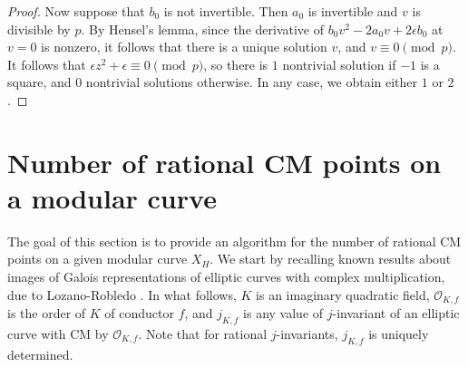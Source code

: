 \documentclass[10pt,leqno]{amsart}
\theoremstyle{definition}
\theoremstyle{remark}
\numberwithin{theorem}{section}
\begin{document}
\begin{proof}
Now suppose that $b_0$ is not invertible. Then $a_0$ is invertible and $v$ is divisible by $p$. By Hensel's lemma, since the derivative of $b_0v^2-2a_0v+2\epsilon b_0$ at $v=0$ is nonzero, it follows that there is a unique solution $v$, and $v\equiv 0 \pmod p$. It follows that $\epsilon z^2+\epsilon\equiv 0 \pmod p$, so there is $1$ nontrivial solution if $-1$ is a square, and $0$ nontrivial solutions otherwise. In any case, we obtain either $1$ or $2$.
\end{proof}

    
\section{Number of rational CM points on a modular curve}\label{sec5}
The goal of this section is to provide an algorithm for the number of rational CM points on a given modular curve $X_H$. We start by recalling known results about images of Galois representations of elliptic curves with complex multiplication, due to Lozano-Robledo \cite{alvarocm}. In what follows, $K$ is an imaginary quadratic field, $\mathcal O_{K,f}$ is the order of $K$ of conductor $f$, and $j_{K,f}$ is any value of $j$-invariant of an elliptic curve with CM by $\mathcal O_{K,f}$. Note that for rational $j$-invariants, $j_{K,f}$ is uniquely determined.
\end{document}
